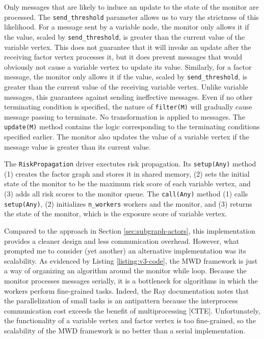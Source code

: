 Only messages that are likely to induce an update to the state of the monitor are processed. The \texttt{send\_threshold} parameter allows us to vary the strictness of this likelihood. For a message sent by a variable node, the monitor only allows it if the value, scaled by \texttt{send\_threshold}, is greater than the current value of the variable vertex. This does not guarantee that it will invoke an update after the receiving factor vertex processes it, but it does prevent messages that would obviously not cause a variable vertex to update its value. Similarly, for a factor message, the monitor only allows it if the value, scaled by \texttt{send\_threshold}, is greater than the current value of the receiving variable vertex. Unlike variable messages, this guarantees against sending ineffective messages. Even if no other terminating condition is specified, the nature of \texttt{filter(M)} will gradually cause message passing to terminate. No transformation is applied to messages. The \texttt{update(M)} method contains the logic corresponding to the terminating conditions specified earlier. The monitor also updates the value of a variable vertex if the message value is greater than its current value.

The \texttt{RiskPropagation} driver exectutes risk propagation. Its \texttt{setup(Any)} method (1) creates the factor graph and stores it in shared memory, (2) sets the initial state of the monitor to be the maximum risk score of each variable vertex, and (3) adds all risk scores to the monitor queue. The \texttt{call(Any)} method (1) calls \texttt{setup(Any)}, (2) initializes \texttt{n\_workers} workers and the monitor, and (3) returns the state of the monitor, which is the exposure score of variable vertex.

Compared to the approach in Section \ref{sec:subgraph-actors}, this implementation provides a cleaner design and less communication overhead. However, what prompted me to consider (yet another) an alternative implementation was its scalability. As evidenced by Listing \ref{listing:v3-code}, the MWD framework is just a way of organizing an algorithm around the monitor while loop. Because the monitor processes messages serially, it is a bottleneck for algorithms in which the workers perform fine-grained tasks. Indeed, the Ray documentation notes that the parallelization of small tasks is an antipattern because the interprocess communication cost exceeds the benefit of multiprocessing [CITE]. Unfortunately, the functionality of a variable vertex and factor vertex is too fine-grained, so the scalability of the MWD framework is no better than a serial implementation.

